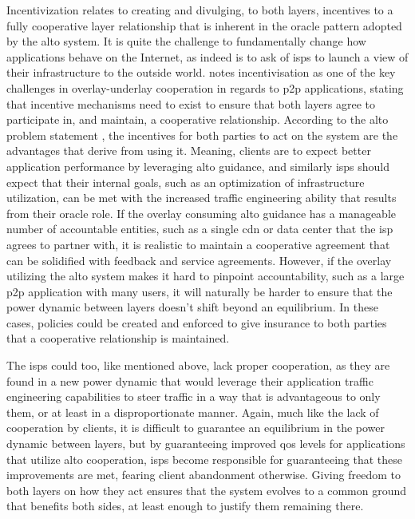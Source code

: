     Incentivization relates to creating and divulging, to both layers, incentives to a fully cooperative layer relationship that is inherent in the oracle pattern adopted by the \gls{alto} system.
    It is quite the challenge to fundamentally change how applications behave on the Internet, as indeed is to ask of \glspl{isp} to launch a view of their infrastructure to the outside world.
    \cite{dan-Commag10} notes incentivisation as one of the key challenges in overlay-underlay cooperation in regards to \gls{p2p} applications, stating that incentive mechanisms need to exist to ensure that both layers agree to participate in, and maintain, a cooperative relationship.
    According to the \gls{alto} problem statement \cite{alto-problem-statement}, the incentives for both parties to act on the system are the advantages that derive from using it.
    Meaning, clients are to expect better application performance by leveraging \gls{alto} guidance, and similarly \glspl{isp} should expect that their internal goals, such as an optimization of infrastructure utilization, can be met with the increased traffic engineering ability that results from their oracle role.
    If the overlay consuming \gls{alto} guidance has a manageable number of accountable entities, such as a single \gls{cdn} or data center that the \gls{isp} agrees to partner with, it is realistic to maintain a cooperative agreement that can be solidified with feedback and service agreements.
    However, if the overlay utilizing the \gls{alto} system makes it hard to pinpoint accountability, such as a large \gls{p2p} application with many users, it will naturally be harder to ensure that the power dynamic between layers doesn't shift beyond an equilibrium.
    In these cases, policies could be created and enforced to give insurance to both parties that a cooperative relationship is maintained.

    The \glspl{isp} could too, like mentioned above, lack proper cooperation, as they are found in a new power dynamic that would leverage their application traffic engineering capabilities to steer traffic in a way that is advantageous to only them, or at least in a disproportionate manner.
    Again, much like the lack of cooperation by clients, it is difficult to guarantee an equilibrium in the power dynamic between layers, but by guaranteeing improved \gls{qos} levels for applications that utilize \gls{alto} cooperation, \glspl{isp} become responsible for guaranteeing that these improvements are met, fearing client abandonment otherwise.
    Giving freedom to both layers on how they act ensures that the system evolves to a common ground that benefits both sides, at least enough to justify them remaining there.

